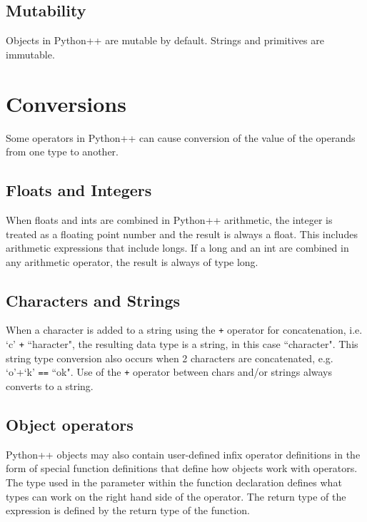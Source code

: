 \documentclass{article}
\begin{document}
\subsection{Mutability}
Objects in Python++ are mutable by default. Strings and primitives are immutable.

\section{Conversions}
Some operators in Python++ can cause conversion of the value of the operands from one type to another.  

\subsection{Floats and Integers}
When floats and ints are combined in Python++ arithmetic, the integer is treated as a floating point number and the result is always a float.  This includes arithmetic expressions that include longs. If a long and an int are combined in any arithmetic operator, the result is always of type long.

\subsection{Characters and Strings}
When a character is added to a string using the \texttt{+} operator for concatenation, i.e. `c' \texttt{+} ``haracter", the resulting data type is a string, in this case ``character".  This string type conversion also occurs when 2 characters are concatenated, e.g. `o'+`k' \texttt{==} ``ok".  Use of the \texttt{+} operator between chars and/or strings always converts to a string.

\subsection{Object operators}
\label{sec:object-operators}

Python++ objects may also contain user-defined infix operator definitions in the form of special function definitions that define how objects work with operators.  The type used in the parameter within the function declaration defines what types can work on the right hand side of the operator.  The return type of the expression is defined by the return  type of the function.  
\end{document}
